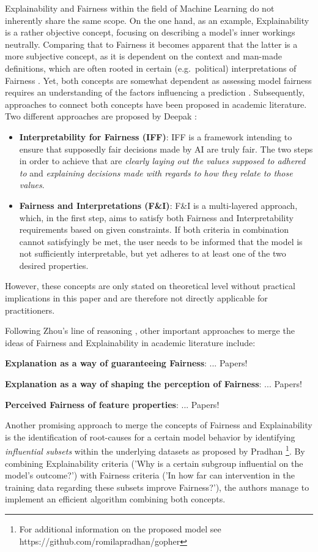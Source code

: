 Explainability and Fairness within the field of Machine Learning do not inherently share the same scope. On the one hand, as an example, Explainability is a rather objective concept, focusing on describing a model's inner workings neutrally. 
Comparing that to Fairness it becomes apparent that the latter is a more subjective concept, as it is dependent on the context and man-made definitions, which are often rooted in certain (e.g.\ political) interpretations of Fairness \parencite{Deepak2021}.
Yet, both concepts are somewhat dependent as assessing model fairness requires an understanding of the factors influencing a prediction \parencite{Zhou2022}.
Subsequently, approaches to connect both concepts have been proposed in academic literature. Two different approaches are proposed by Deepak \parencite{Deepak2021}: 
\begin{itemize}
    \item \textbf{Interpretability for Fairness (IFF)}: IFF is a framework intending to ensure that supposedly fair decisions made by AI are truly fair. The two steps in order to achieve that are \textit{clearly laying out the values supposed to adhered to} and \textit{explaining decisions made with regards to how they relate to those values}.
    \item \textbf{Fairness and Interpretations (F\&I)}: F\&I is a multi-layered approach, which, in the first step, aims to satisfy both Fairness and Interpretability requirements based on given constraints. If both criteria in combination cannot satisfyingly be met, the user needs to be informed that the model is not sufficiently interpretable, but yet adheres to at least one of the two desired properties.
\end{itemize}
However, these concepts are only stated on theoretical level without practical implications in this paper and are therefore not directly applicable for practitioners.


Following Zhou's line of reasoning \parencite{Zhou2022}, other important approaches to merge the ideas of Fairness and Explainability in academic literature include:

\textbf{Explanation as a way of guaranteeing Fairness}: ... Papers!

\textbf{Explanation as a way of shaping the perception of Fairness}: ... Papers!

\textbf{Perceived Fairness of feature properties}: ... Papers!


Another promising approach to merge the concepts of Fairness and Explainability is the identification of root-causes for a certain model behavior by identifying \textit{influential subsets} within the underlying datasets as proposed by Pradhan \parencite{Pradhan2022}\footnote{For additional information on the proposed model see https://github.com/romilapradhan/gopher}.
By combining Explainability criteria ('Why is a certain subgroup influential on the model's outcome?') with Fairness criteria ('In how far can intervention in the training data regarding these subsets improve Fairness?'), the authors manage to implement an efficient algorithm combining both concepts.

